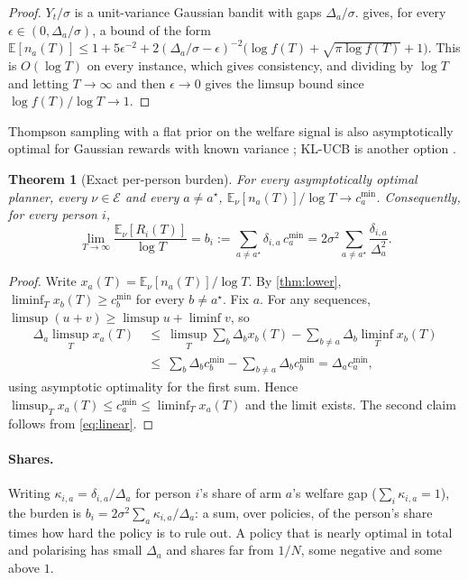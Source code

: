 \documentclass[11pt,a4paper]{article}
\theoremstyle{plain}
\newtheorem{theorem}{Theorem}
\theoremstyle{definition}
\theoremstyle{remark}
\newcommand{\E}{\mathbb{E}}
\newcommand{\cmin}{c^{\min}}
\newcommand{\astar}{a^\star}
\newcommand{\Env}{\mathcal{E}}
\begin{document}
\begin{proof}
$Y_t/\sigma$ is a unit-variance Gaussian bandit with gaps $\Delta_a/\sigma$. \citet[Theorem~8.1]{lattimore2020} gives, for every $\epsilon\in(0,\Delta_a/\sigma)$, a bound of the form $\E[n_a(T)]\le 1+5\epsilon^{-2}+2(\Delta_a/\sigma-\epsilon)^{-2}\big(\log f(T)+\sqrt{\pi\log f(T)}+1\big)$. %
This is $O(\log T)$ on every instance, which gives consistency, and dividing by $\log T$ and letting $T\to\infty$ and then $\epsilon\to0$ gives the limsup bound since $\log f(T)/\log T\to1$.
\end{proof}

Thompson sampling with a flat prior on the welfare signal is also asymptotically optimal for Gaussian rewards with known variance \citep{korda2013}; KL-UCB is another option \citep{cappe2013}.

\begin{theorem}[Exact per-person burden]\label{thm:exact}
For every asymptotically optimal planner, every $\nu\in\Env$ and every $a\neq\astar$, $\E_\nu[n_a(T)]/\log T\to\cmin_a$. Consequently, for every person $i$,
\[
  \lim_{T\to\infty}\frac{\E_\nu[R_i(T)]}{\log T}=b_i:=\sum_{a\neq\astar}\delta_{i,a}\,\cmin_a=2\sigma^2\sum_{a\neq\astar}\frac{\delta_{i,a}}{\Delta_a^2}.
\]
\end{theorem}

\begin{proof}
Write $x_a(T)=\E_\nu[n_a(T)]/\log T$. By \cref{thm:lower}, $\liminf_Tx_b(T)\ge\cmin_b$ for every $b\neq\astar$. Fix $a$. For any sequences, $\limsup(u+v)\ge\limsup u+\liminf v$, so
\begin{align*}
  \Delta_a\limsup_Tx_a(T)\ &\le\ \limsup_T\sum_{b}\Delta_bx_b(T)-\sum_{b\neq a}\Delta_b\liminf_Tx_b(T)\\
  &\le\ \sum_b\Delta_b\cmin_b-\sum_{b\neq a}\Delta_b\cmin_b=\Delta_a\cmin_a,
\end{align*}
using asymptotic optimality for the first sum. Hence $\limsup_Tx_a(T)\le\cmin_a\le\liminf_Tx_a(T)$ and the limit exists. The second claim follows from \eqref{eq:linear}.
\end{proof}

\paragraph{Shares.} Writing $\kappa_{i,a}=\delta_{i,a}/\Delta_a$ for person $i$'s share of arm $a$'s welfare gap ($\sum_i\kappa_{i,a}=1$), the burden is $b_i=2\sigma^2\sum_a\kappa_{i,a}/\Delta_a$: a sum, over policies, of the person's share times how hard the policy is to rule out. A policy that is nearly optimal in total and polarising has small $\Delta_a$ and shares far from $1/N$, some negative and some above $1$.
\end{document}
